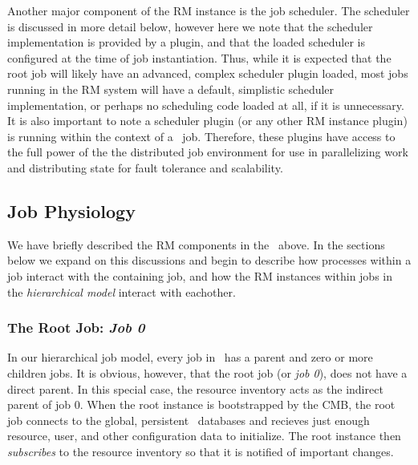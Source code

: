 Another major component of the RM instance is the job scheduler.
The scheduler is discussed in more detail below, however here we
note that the scheduler implementation is provided by a plugin,
and that the loaded scheduler is configured at the time of job
instantiation. Thus, while it is expected that the root job will
likely have an advanced, complex scheduler plugin loaded, most jobs
running in the RM system will have a default, simplistic scheduler
implementation, or perhaps no scheduling code loaded at all, if
it is unnecessary. It is also important to note a scheduler plugin
(or any other RM instance plugin) is running within the context of a
\ngrm\ job. Therefore, these plugins have access to the full power
of the the distributed job environment for use in parallelizing
work and distributing state for fault tolerance and scalability.

\subsection{Job Physiology}

We have briefly described the RM components in the \ngrm\ above.
In the sections below we expand on this discussions and begin
to describe how processes within a job interact with the containing
job, and how the RM instances within jobs in the \emph{hierarchical model}
interact with eachother.

\subsubsection{The Root Job: \emph{Job 0}}

In our hierarchical job model, every job in \ngrm\ has a parent
and zero or more children jobs. It is obvious, however, that
the root job (or \emph{job 0}), does not have a direct parent.
In this special case, the resource inventory acts as the
indirect parent of job 0. When the root instance is bootstrapped
by the CMB, the root job connects to the global, persistent
\ngrm\ databases and recieves just enough resource, user, and other
configuration data to initialize. The root instance then
\emph{subscribes} to the resource inventory so that it is
notified of important changes.
\ifcomments
{}
\fi

